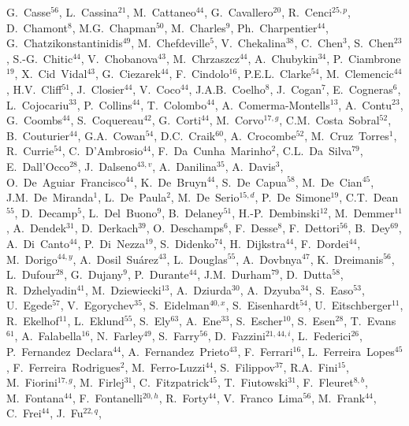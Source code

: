 \begin{flushleft}
G.~Casse$^{56}$,
L.~Cassina$^{21}$,
M.~Cattaneo$^{44}$,
G.~Cavallero$^{20}$,
R.~Cenci$^{25,p}$,
D.~Chamont$^{8}$,
M.G.~Chapman$^{50}$,
M.~Charles$^{9}$,
Ph.~Charpentier$^{44}$,
G.~Chatzikonstantinidis$^{49}$,
M.~Chefdeville$^{5}$,
V.~Chekalina$^{38}$,
C.~Chen$^{3}$,
S.~Chen$^{23}$,
S.-G.~Chitic$^{44}$,
V.~Chobanova$^{43}$,
M.~Chrzaszcz$^{44}$,
A.~Chubykin$^{34}$,
P.~Ciambrone$^{19}$,
X.~Cid~Vidal$^{43}$,
G.~Ciezarek$^{44}$,
F.~Cindolo$^{16}$,
P.E.L.~Clarke$^{54}$,
M.~Clemencic$^{44}$,
H.V.~Cliff$^{51}$,
J.~Closier$^{44}$,
V.~Coco$^{44}$,
J.A.B.~Coelho$^{8}$,
J.~Cogan$^{7}$,
E.~Cogneras$^{6}$,
L.~Cojocariu$^{33}$,
P.~Collins$^{44}$,
T.~Colombo$^{44}$,
A.~Comerma-Montells$^{13}$,
A.~Contu$^{23}$,
G.~Coombs$^{44}$,
S.~Coquereau$^{42}$,
G.~Corti$^{44}$,
M.~Corvo$^{17,g}$,
C.M.~Costa~Sobral$^{52}$,
B.~Couturier$^{44}$,
G.A.~Cowan$^{54}$,
D.C.~Craik$^{60}$,
A.~Crocombe$^{52}$,
M.~Cruz~Torres$^{1}$,
R.~Currie$^{54}$,
C.~D'Ambrosio$^{44}$,
F.~Da~Cunha~Marinho$^{2}$,
C.L.~Da~Silva$^{79}$,
E.~Dall'Occo$^{28}$,
J.~Dalseno$^{43,v}$,
A.~Danilina$^{35}$,
A.~Davis$^{3}$,
O.~De~Aguiar~Francisco$^{44}$,
K.~De~Bruyn$^{44}$,
S.~De~Capua$^{58}$,
M.~De~Cian$^{45}$,
J.M.~De~Miranda$^{1}$,
L.~De~Paula$^{2}$,
M.~De~Serio$^{15,d}$,
P.~De~Simone$^{19}$,
C.T.~Dean$^{55}$,
D.~Decamp$^{5}$,
L.~Del~Buono$^{9}$,
B.~Delaney$^{51}$,
H.-P.~Dembinski$^{12}$,
M.~Demmer$^{11}$,
A.~Dendek$^{31}$,
D.~Derkach$^{39}$,
O.~Deschamps$^{6}$,
F.~Desse$^{8}$,
F.~Dettori$^{56}$,
B.~Dey$^{69}$,
A.~Di~Canto$^{44}$,
P.~Di~Nezza$^{19}$,
S.~Didenko$^{74}$,
H.~Dijkstra$^{44}$,
F.~Dordei$^{44}$,
M.~Dorigo$^{44,y}$,
A.~Dosil~Su{\'a}rez$^{43}$,
L.~Douglas$^{55}$,
A.~Dovbnya$^{47}$,
K.~Dreimanis$^{56}$,
L.~Dufour$^{28}$,
G.~Dujany$^{9}$,
P.~Durante$^{44}$,
J.M.~Durham$^{79}$,
D.~Dutta$^{58}$,
R.~Dzhelyadin$^{41}$,
M.~Dziewiecki$^{13}$,
A.~Dziurda$^{30}$,
A.~Dzyuba$^{34}$,
S.~Easo$^{53}$,
U.~Egede$^{57}$,
V.~Egorychev$^{35}$,
S.~Eidelman$^{40,x}$,
S.~Eisenhardt$^{54}$,
U.~Eitschberger$^{11}$,
R.~Ekelhof$^{11}$,
L.~Eklund$^{55}$,
S.~Ely$^{63}$,
A.~Ene$^{33}$,
S.~Escher$^{10}$,
S.~Esen$^{28}$,
T.~Evans$^{61}$,
A.~Falabella$^{16}$,
N.~Farley$^{49}$,
S.~Farry$^{56}$,
D.~Fazzini$^{21,44,i}$,
L.~Federici$^{26}$,
P.~Fernandez~Declara$^{44}$,
A.~Fernandez~Prieto$^{43}$,
F.~Ferrari$^{16}$,
L.~Ferreira~Lopes$^{45}$,
F.~Ferreira~Rodrigues$^{2}$,
M.~Ferro-Luzzi$^{44}$,
S.~Filippov$^{37}$,
R.A.~Fini$^{15}$,
M.~Fiorini$^{17,g}$,
M.~Firlej$^{31}$,
C.~Fitzpatrick$^{45}$,
T.~Fiutowski$^{31}$,
F.~Fleuret$^{8,b}$,
M.~Fontana$^{44}$,
F.~Fontanelli$^{20,h}$,
R.~Forty$^{44}$,
V.~Franco~Lima$^{56}$,
M.~Frank$^{44}$,
C.~Frei$^{44}$,
J.~Fu$^{22,q}$,

\end{flushleft}
